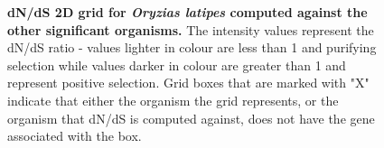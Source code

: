 \documentclass{article}
\begin{document}
\begin{figure}[H]
\centering
{}
\caption{\textbf{dN/dS 2D grid for \textit{Oryzias latipes} computed against the other significant organisms.} The intensity values represent the dN/dS ratio - values lighter in colour are less than 1 and purifying selection while values darker in colour are greater than 1 and represent positive selection. Grid boxes that are marked with "X" indicate that either the organism the grid represents, or the organism that dN/dS is computed against, does not have the gene associated with the box.}
\label{sup_fig_31}
\end{figure}
\end{document}
